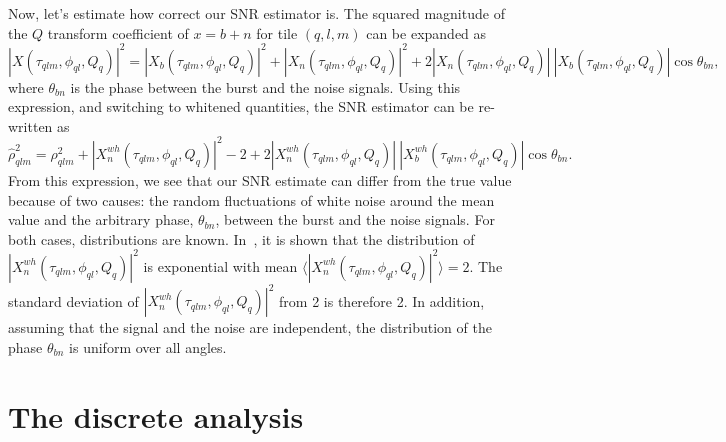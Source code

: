 \documentclass[aps]{revtex4-1}
\begin{document}
Now, let's estimate how correct our SNR estimator is. The squared magnitude of the $Q$ transform coefficient of $x=b+n$ for tile $(q,l,m)$ can be expanded as
\begin{equation}
  |X(\tau_{qlm}, \phi_{ql}, Q_q)|^2 = |X_b(\tau_{qlm}, \phi_{ql}, Q_q)|^2 + |X_n(\tau_{qlm}, \phi_{ql}, Q_q)|^2 + 2|X_n(\tau_{qlm}, \phi_{ql}, Q_q)|\ |X_b(\tau_{qlm}, \phi_{ql}, Q_q)|\cos{\theta_{bn}},
\end{equation}
where $\theta_{bn}$ is the phase between the burst and the noise signals. Using this expression, and switching to whitened quantities, the SNR estimator can be re-written as
\begin{equation}
  \hat{\rho}_{qlm}^2  =
  \rho_{qlm}^2
  + |X^{wh}_n(\tau_{qlm}, \phi_{ql}, Q_q)|^2 - 2
  + 2|X^{wh}_n(\tau_{qlm}, \phi_{ql}, Q_q)|\ |X^{wh}_b(\tau_{qlm}, \phi_{ql}, Q_q)| \cos{\theta_{bn}}.
  \label{eq:snrbias}
\end{equation}
From this expression, we see that our SNR estimate can differ from the true value because of two causes: the random fluctuations of white noise around the mean value and the arbitrary phase, $\theta_{bn}$, between the burst and the noise signals. For both cases, distributions are known. In~\cite{Chatterji:2004}, it is shown that the distribution of $|X^{wh}_n(\tau_{qlm}, \phi_{ql}, Q_q)|^2$ is exponential with mean $\langle |X^{wh}_n(\tau_{qlm}, \phi_{ql}, Q_q)|^2 \rangle = 2$. The standard deviation of $|X^{wh}_n(\tau_{qlm}, \phi_{ql}, Q_q)|^2$ from 2 is therefore 2. In addition, assuming that the signal and the noise are independent, the distribution of the phase $\theta_{bn}$ is uniform over all angles.

\section{The discrete analysis} \label{sec:discrete}
\end{document}
